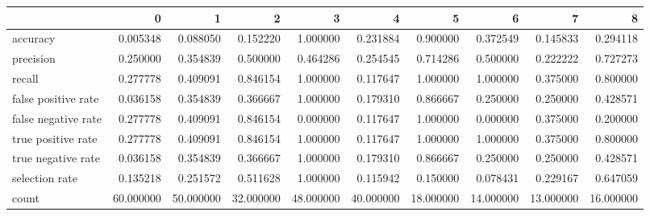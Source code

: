 \begin{tabular}{lrrrrrrrrr}
\toprule
{} &          0 &          1 &          2 &          3 &          4 &          5 &          6 &          7 &          8 \\
\midrule
accuracy            &   0.005348 &   0.088050 &   0.152220 &   1.000000 &   0.231884 &   0.900000 &   0.372549 &   0.145833 &   0.294118 \\
precision           &   0.250000 &   0.354839 &   0.500000 &   0.464286 &   0.254545 &   0.714286 &   0.500000 &   0.222222 &   0.727273 \\
recall              &   0.277778 &   0.409091 &   0.846154 &   1.000000 &   0.117647 &   1.000000 &   1.000000 &   0.375000 &   0.800000 \\
false positive rate &   0.036158 &   0.354839 &   0.366667 &   1.000000 &   0.179310 &   0.866667 &   0.250000 &   0.250000 &   0.428571 \\
false negative rate &   0.277778 &   0.409091 &   0.846154 &   0.000000 &   0.117647 &   1.000000 &   0.000000 &   0.375000 &   0.200000 \\
true positive rate  &   0.277778 &   0.409091 &   0.846154 &   1.000000 &   0.117647 &   1.000000 &   1.000000 &   0.375000 &   0.800000 \\
true negative rate  &   0.036158 &   0.354839 &   0.366667 &   1.000000 &   0.179310 &   0.866667 &   0.250000 &   0.250000 &   0.428571 \\
selection rate      &   0.135218 &   0.251572 &   0.511628 &   1.000000 &   0.115942 &   0.150000 &   0.078431 &   0.229167 &   0.647059 \\
count               &  60.000000 &  50.000000 &  32.000000 &  48.000000 &  40.000000 &  18.000000 &  14.000000 &  13.000000 &  16.000000 \\
\bottomrule
\end{tabular}
